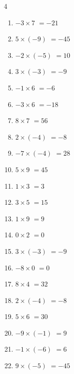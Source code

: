 \begin{multicols}{4}
\begin{enumerate}
  \item $-3\times 7$
        $=-21$

  \item $5\times (-9)$
        $=-45$

  \item $-2\times (-5)$
        $=10$

  \item $3\times (-3)$
        $=-9$

  \item $-1\times 6$
        $=-6$

  \item $-3\times 6$
        $=-18$

  \item $8\times 7$
        $=56$

  \item $2\times (-4)$
        $=-8$

  \item $-7\times (-4)$
        $=28$

  \item $5\times 9$
        $=45$

  \item $1\times 3$
        $=3$

\columnbreak %

  \item $3\times 5$
        $=15$

  \item $1\times 9$
        $=9$

  \item $0\times 2$
        $=0$

  \item $3\times (-3)$
        $=-9$

  \item $-8\times 0$
        $=0$

  \item $8\times 4$
        $=32$

  \item $2\times (-4)$
        $=-8$

  \item $5\times 6$
        $=30$

  \item $-9\times (-1)$
        $=9$

  \item $-1\times (-6)$
        $=6$

  \item $9\times (-5)$
        $=-45$


\end{enumerate}
\end{multicols}
